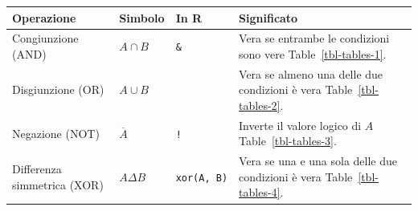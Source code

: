 \documentclass[
  a4paper,
  DIV=11,
  numbers=noendperiod]{scrreprt}
\begin{document}
\begin{longtable}[]{@{}
  >{\raggedright\arraybackslash}p{}
  >{\centering\arraybackslash}p{}
  >{\centering\arraybackslash}p{}
  >{\raggedright\arraybackslash}p{}@{}}
\toprule\noalign{}
\begin{minipage}[b]{\linewidth}\raggedright
Operazione
\end{minipage} & \begin{minipage}[b]{\linewidth}\centering
Simbolo
\end{minipage} & \begin{minipage}[b]{\linewidth}\centering
In R
\end{minipage} & \begin{minipage}[b]{\linewidth}\raggedright
Significato
\end{minipage} \\
\midrule\noalign{}
\endhead
\bottomrule\noalign{}
\endlastfoot
Congiunzione (AND) & \(A \cap B\) & \texttt{\&} & Vera se entrambe le
condizioni sono vere Table~\ref{tbl-tables-1}. \\
Disgiunzione (OR) & \(A \cup B\) & \texttt{\textbar{}} & Vera se almeno
una delle due condizioni è vera Table~\ref{tbl-tables-2}. \\
Negazione (NOT) & \(\overline{A}\) & \texttt{!} & Inverte il valore
logico di \(A\) Table~\ref{tbl-tables-3}. \\
Differenza simmetrica (XOR) & \(A \Delta B\) & \texttt{xor(A,\ B)} &
Vera se una e una sola delle due condizioni è vera
Table~\ref{tbl-tables-4}. \\
\end{longtable}
\end{document}
